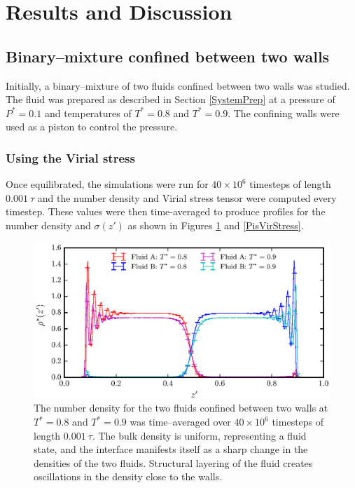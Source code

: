 \section{Results and Discussion}
\subsection{Binary--mixture confined between two walls}\label{Piston}
Initially, a binary--mixture of two fluids confined between two walls was studied. 
The fluid was prepared as described in Section \ref{SystemPrep} at a pressure of $P^{*} = 0.1$ and temperatures of $T^{*} = 0.8$ and $T^{*} = 0.9$.
The confining walls were used as a piston to control the pressure.

\subsubsection{Using the Virial stress}\label{VirialStressPiston}
Once equilibrated, the simulations were run for $40 \times 10^{6}$ timesteps of length $0.001\ \tau$ and the number density and Virial stress tensor were computed every timestep.
These values were then time-averaged to produce profiles for the number density and $\sigma(z')$ as shown in Figures \ref{PisVirRho} and \ref{PisVirStress}. 

\FloatBarrier
\begin{figure}[h]
\centering
\includegraphics[scale=1.0]{PisVirRho}
\caption{The number density for the two fluids confined between two walls at $T^{*} = 0.8$ and $T^{*} = 0.9$ was time--averaged over $40 \times 10^{6}$ timesteps of length $0.001\ \tau$. 
The bulk density is uniform, representing a fluid state, and the interface manifests itself as a sharp change in the densities of the two fluids.
Structural layering of the fluid creates oscillations in the density close to the walls.
}
\label{PisVirRho}
\end{figure}

